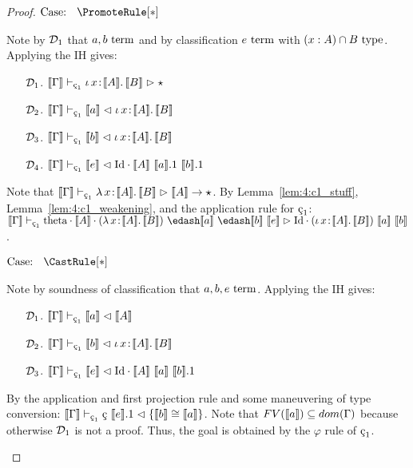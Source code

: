\begin{proof}
    $\text{Case: }\begin{array}{c} \PromoteRule[*] \end{array}$
    \begin{proofcase}
        Note by $\mathcal{D}_{1}$ that $a, b~\textnormal{term}$ and by classification $e~\textnormal{term}$ with $(x : A) \cap B~\textnormal{type}$.
        Applying the IH gives:
        \begin{enumerate}
            \item[$\mathcal{D}_{1}$.] $\sema{\Gamma} \vdash_{\oldced} \abs{\iota}{x}{\sema{A}}{\sema{B}} \infr \star$
            \item[$\mathcal{D}_{2}$.] $\sema{\Gamma} \vdash_{\oldced} \sema{a} \chck \abs{\iota}{x}{\sema{A}}{\sema{B}}$
            \item[$\mathcal{D}_{3}$.] $\sema{\Gamma} \vdash_{\oldced} \sema{b} \chck \abs{\iota}{x}{\sema{A}}{\sema{B}}$
            \item[$\mathcal{D}_{4}$.] $\sema{\Gamma} \vdash_{\oldced} \sema{e} \chck \cId \cdot \sema{A}\ \sema{a}.1\ \sema{b}.1$
        \end{enumerate}
        Note that $\sema{\Gamma} \vdash_{\oldced} \abs{\lambda}{x}{\sema{A}}{\sema{B}} \infr \sema{A} \to \star$.
        By Lemma~\ref{lem:4:c1_stuff}, Lemma~\ref{lem:4:c1_weakening}, and the application rule for $\oldced$:
            $\sema{\Gamma} \vdash_{\oldced} \ctheta \cdot \sema{A} \cdot (\abs{\lambda}{x}{\sema{A}}{\sema{B}})\ \edash \sema{a}\ \edash \sema{b}\ \sema{e} \infr \cId \cdot (\abs{\iota}{x}{\sema{A}}{\sema{B}})\ \sema{a}\ \sema{b}$.
    \end{proofcase}

    $\text{Case: }\begin{array}{c} \CastRule[*] \end{array}$
    \begin{proofcase}
        Note by soundness of classification that $a, b, e~\textnormal{term}$.
        Applying the IH gives:
        \begin{enumerate}
            \item[$\mathcal{D}_{1}$.] $\sema{\Gamma} \vdash_{\oldced} \sema{a} \chck \sema{A}$
            \item[$\mathcal{D}_{2}$.] $\sema{\Gamma} \vdash_{\oldced} \sema{b} \chck \abs{\iota}{x}{\sema{A}}{\sema{B}}$
            \item[$\mathcal{D}_{3}$.] $\sema{\Gamma} \vdash_{\oldced} \sema{e} \chck \cId \cdot \sema{A}\ \sema{a}\ \sema{b}.1$
        \end{enumerate}
        By the application and first projection rule and some maneuvering of type conversion: $\sema{\Gamma} \vdash_{\oldced} \text{\c{c}}\ \sema{e}.1 \chck \{ \sema{b} \cong \sema{a}\}$.
        Note that $FV(\llbracket a \rrbracket) \subseteq dom(\Gamma)$ because otherwise $\mathcal{D}_{1}$ is not a proof.
        Thus, the goal is obtained by the $\varphi$ rule of $\oldced$.
    \end{proofcase}


\end{proof}
